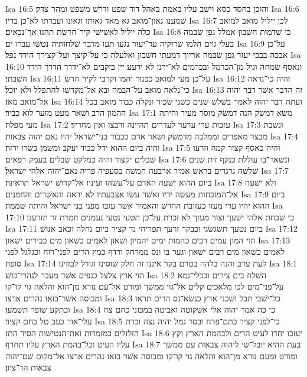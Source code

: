 Isa 16:5  והוכן בחסד כסא וישׁב עליו באמת באהל דוד שׁפט ודרשׁ משׁפט ומהר צדק׃
Isa 16:6  שׁמענו גאון־מואב גא מאד גאותו וגאונו ועברתו לא־כן בדיו׃
Isa 16:7  לכן ייליל מואב למואב כלה ייליל לאשׁישׁי קיר־חרשׂת תהגו אך־נכאים׃
Isa 16:8  כי שׁדמות חשׁבון אמלל גפן שׂבמה בעלי גוים הלמו שׂרוקיה עד־יעזר נגעו תעו מדבר שׁלחותיה נטשׁו עברו ים׃
Isa 16:9  על־כן אבכה בבכי יעזר גפן שׂבמה אריוך דמעתי חשׁבון ואלעלה כי על־קיצך ועל־קצירך הידד נפל׃
Isa 16:10  ונאסף שׂמחה וגיל מן־הכרמל ובכרמים לא־ירנן לא ירעע יין ביקבים לא־ידרך הדרך הידד השׁבתי׃
Isa 16:11  על־כן מעי למואב ככנור יהמו וקרבי לקיר חרשׂ׃
Isa 16:12  והיה כי־נראה כי־נלאה מואב על־הבמה ובא אל־מקדשׁו להתפלל ולא יוכל׃
Isa 16:13  זה הדבר אשׁר דבר יהוה אל־מואב מאז׃
Isa 16:14  ועתה דבר יהוה לאמר בשׁלשׁ שׁנים כשׁני שׂכיר ונקלה כבוד מואב בכל ההמון הרב ושׁאר מעט מזער לוא כביר׃
Isa 17:1  משׂא דמשׂק הנה דמשׂק מוסר מעיר והיתה מעי מפלה׃
Isa 17:2  עזבות ערי ערער לעדרים תהיינה ורבצו ואין מחריד׃
Isa 17:3  ונשׁבת מבצר מאפרים וממלכה מדמשׂק ושׁאר ארם ככבוד בני־ישׂראל יהיו נאם יהוה צבאות׃
Isa 17:4  והיה ביום ההוא ידל כבוד יעקב ומשׁמן בשׂרו ירזה׃
Isa 17:5  והיה כאסף קציר קמה וזרעו שׁבלים יקצור והיה כמלקט שׁבלים בעמק רפאים׃
Isa 17:6  ונשׁאר־בו עוללת כנקף זית שׁנים שׁלשׁה גרגרים בראשׁ אמיר ארבעה חמשׁה בסעפיה פריה נאם־יהוה אלהי ישׂראל׃
Isa 17:7  ביום ההוא ישׁעה האדם על־עשׂהו ועיניו אל־קדושׁ ישׂראל תראינה׃
Isa 17:8  ולא ישׁעה אל־המזבחות מעשׂה ידיו ואשׁר עשׂו אצבעתיו לא יראה והאשׁרים והחמנים׃
Isa 17:9  ביום ההוא יהיו ערי מעזו כעזובת החרשׁ והאמיר אשׁר עזבו מפני בני ישׂראל והיתה שׁממה׃
Isa 17:10  כי שׁכחת אלהי ישׁעך וצור מעזך לא זכרת על־כן תטעי נטעי נעמנים וזמרת זר תזרענו׃
Isa 17:11  ביום נטעך תשׂגשׂגי ובבקר זרעך תפריחי נד קציר ביום נחלה וכאב אנושׁ׃
Isa 17:12  הוי המון עמים רבים כהמות ימים יהמיון ושׁאון לאמים כשׁאון מים כבירים ישׁאון׃
Isa 17:13  לאמים כשׁאון מים רבים ישׁאון וגער בו ונס ממרחק ורדף כמץ הרים לפני־רוח וכגלגל לפני סופה׃
Isa 17:14  לעת ערב והנה בלהה בטרם בקר איננו זה חלק שׁוסינו וגורל לבזזינו׃
Isa 18:1  הוי ארץ צלצל כנפים אשׁר מעבר לנהרי־כושׁ׃
Isa 18:2  השׁלח בים צירים ובכלי־גמא על־פני־מים לכו מלאכים קלים אל־גוי ממשׁך ומורט אל־עם נורא מן־הוא והלאה גוי קו־קו ומבוסה אשׁר־בזאו נהרים ארצו׃
Isa 18:3  כל־ישׁבי תבל ושׁכני ארץ כנשׂא־נס הרים תראו וכתקע שׁופר תשׁמעו׃
Isa 18:4  כי כה אמר יהוה אלי אשׁקוטה ואביטה במכוני כחם צח עלי־אור כעב טל בחם קציר׃
Isa 18:5  כי־לפני קציר כתם־פרח ובסר גמל יהיה נצה וכרת הזלזלים במזמרות ואת־הנטישׁות הסיר התז׃
Isa 18:6  יעזבו יחדו לעיט הרים ולבהמת הארץ וקץ עליו העיט וכל־בהמת הארץ עליו תחרף׃
Isa 18:7  בעת ההיא יובל־שׁי ליהוה צבאות עם ממשׁך ומורט ומעם נורא מן־הוא והלאה גוי קו־קו ומבוסה אשׁר בזאו נהרים ארצו אל־מקום שׁם־יהוה צבאות הר־ציון׃
